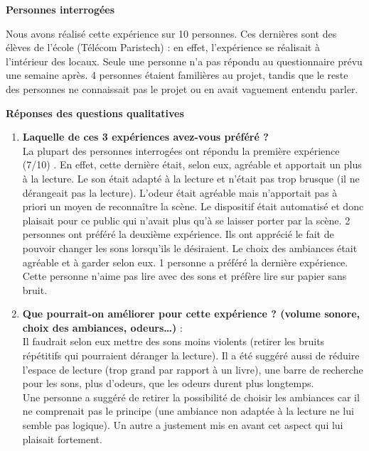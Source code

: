 \documentclass[a4paper,14pt]{report}
\begin{document}
\begin{center}
\textbf{Personnes interrogées} 
\end{center}

Nous avons réalisé cette expérience sur 10 personnes. Ces dernières sont des élèves de l'école (Télécom Paristech) : en effet, l'expérience se réalisait à l'intérieur des locaux. Seule une personne n'a pas répondu au questionnaire prévu une semaine après. 4 personnes étaient familières au projet, tandis que le reste des personnes ne connaissait pas le projet ou en avait vaguement entendu parler. \\[0.5cm]


\begin{center}
\textbf{Réponses des questions qualitatives}
\end{center}
\begin{enumerate}
\item \textbf{Laquelle de ces 3 expériences avez-vous préféré ? } \\
La plupart des personnes interrogées ont répondu la première expérience (7/10) . En effet, cette dernière était, selon eux, agréable et apportait un plus à la lecture. Le son était adapté à la lecture et n'était pas trop brusque (il ne dérangeait pas la lecture). L'odeur était agréable mais n'apportait pas à priori un moyen de reconnaître la scène. Le dispositif était automatisé et donc plaisait pour ce public qui n'avait plus qu'à se laisser porter par la scène.
2 personnes ont préféré la deuxième expérience. Ils ont apprécié le fait de pouvoir changer les sons lorsqu'ils le désiraient. Le choix des ambiances était agréable et à garder selon eux.
1 personne a préféré la dernière expérience. Cette personne n'aime pas lire avec des sons et préfère lire sur papier sans bruit. 

\item \textbf{Que pourrait-on améliorer pour cette expérience ? (volume sonore, choix des
ambiances, odeurs…)} : \\
Il faudrait selon eux mettre des sons moins violents (retirer les bruits répétitifs qui pourraient déranger la lecture).
Il a été suggéré aussi de réduire l'espace de lecture (trop grand par rapport à un livre), une barre de recherche pour les sons, plus d'odeurs, que les odeurs durent plus longtemps.\\
Une personne a suggéré de retirer la possibilité de choisir les ambiances car il ne comprenait pas le principe (une ambiance non adaptée à la lecture ne lui semble pas logique). Un autre a justement mis en avant cet aspect qui lui plaisait fortement.


\end{enumerate}
\end{document}

